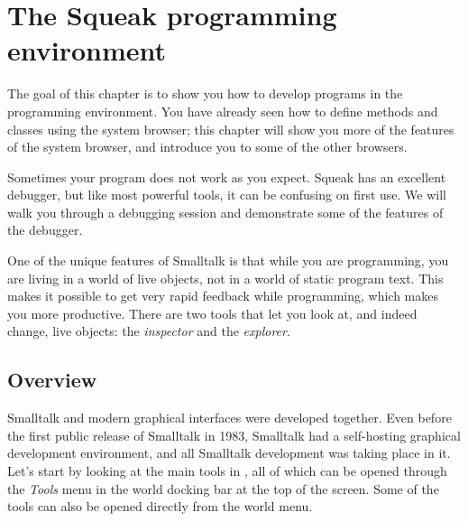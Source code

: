 \documentclass[a4paper,10pt,twoside]{book}
\begin{document}
	\renewcommand{\nnbb}[2]{} %
\fi
\chapter{The Squeak programming environment}
\label{cha:env}

The goal of this chapter is to show you how to develop programs in the \Squeak programming environment.
You have already seen how to define methods and classes using the system browser; this chapter will show you more of the features of the system browser, and introduce you to some of the other browsers.

Sometimes your program does not work as you expect.
Squeak has an excellent debugger, but like most powerful tools, it can be confusing on first use.
We will walk you through a debugging session and demonstrate some of the features of the debugger.

One of the unique features of Smalltalk is that while you are programming, you are living in a world of live objects, not in a world of static program text.
This makes it possible to get very rapid feedback while programming, which makes you more productive.
There are two tools that let you look at, and indeed change, live objects: the \emph{inspector} and the \emph{explorer}.


\section{Overview}
\label{sec:overview}

Smalltalk and modern graphical interfaces were developed together.
Even before the first public release of Smalltalk in 1983, Smalltalk had a self-hosting graphical development environment, and all Smalltalk development was taking place in it.
Let's start by looking at the main tools in \Squeak, all of which can be opened through the \emph{Tools} menu in the world docking bar at the top of the screen. Some of the tools can also be opened directly from the world menu.
\end{document}
